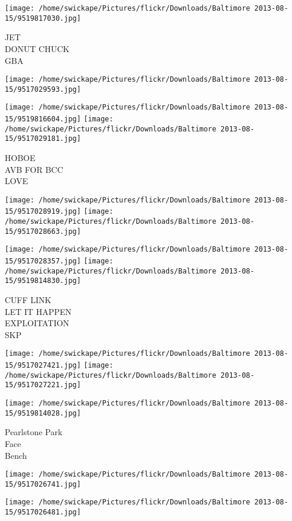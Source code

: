 \documentclass[10pt,letterpaper]{article}
\begin{document}
\texttt{[image: /home/swickape/Pictures/flickr/Downloads/Baltimore 2013-08-15/9519817030.jpg]}

JET\\
DONUT CHUCK\\
GBA
\pagebreak

\texttt{[image: /home/swickape/Pictures/flickr/Downloads/Baltimore 2013-08-15/9517029593.jpg]}

\vspace{0.25in}
\texttt{[image: /home/swickape/Pictures/flickr/Downloads/Baltimore 2013-08-15/9519816604.jpg]}
\texttt{[image: /home/swickape/Pictures/flickr/Downloads/Baltimore 2013-08-15/9517029181.jpg]}

HOBOE\\
AVB FOR BCC\\
LOVE
\pagebreak

\texttt{[image: /home/swickape/Pictures/flickr/Downloads/Baltimore 2013-08-15/9517028919.jpg]}
\texttt{[image: /home/swickape/Pictures/flickr/Downloads/Baltimore 2013-08-15/9517028663.jpg]}

\texttt{[image: /home/swickape/Pictures/flickr/Downloads/Baltimore 2013-08-15/9517028357.jpg]}
\texttt{[image: /home/swickape/Pictures/flickr/Downloads/Baltimore 2013-08-15/9519814830.jpg]}

CUFF LINK\\
LET IT HAPPEN\\
EXPLOITATION\\
SKP
\pagebreak

\texttt{[image: /home/swickape/Pictures/flickr/Downloads/Baltimore 2013-08-15/9517027421.jpg]}
\texttt{[image: /home/swickape/Pictures/flickr/Downloads/Baltimore 2013-08-15/9517027221.jpg]}

\vspace{0.25in}
\texttt{[image: /home/swickape/Pictures/flickr/Downloads/Baltimore 2013-08-15/9519814028.jpg]}

Pearlstone Park\\
Face\\
Bench
\pagebreak

\texttt{[image: /home/swickape/Pictures/flickr/Downloads/Baltimore 2013-08-15/9517026741.jpg]}

\vspace{0.25in}
\texttt{[image: /home/swickape/Pictures/flickr/Downloads/Baltimore 2013-08-15/9517026481.jpg]}
\end{document}
